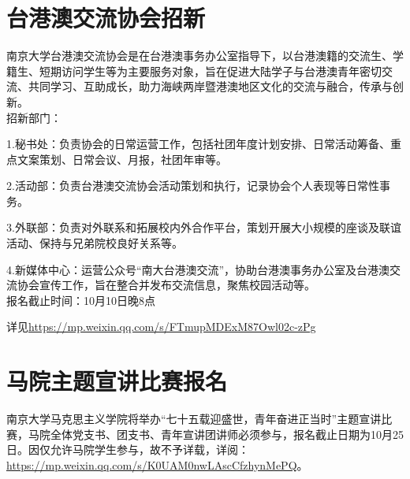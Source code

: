 \documentclass[letterpaper, 12pt]{article}
\begin{document}
\begin{multicols}{2}
\section{台港澳交流协会招新}
南京大学台港澳交流协会是在台港澳事务办公室指导下，以台港澳籍的交流生、学籍生、短期访问学生等为主要服务对象，旨在促进大陆学子与台港澳青年密切交流、共同学习、互助成长，助力海峡两岸暨港澳地区文化的交流与融合，传承与创新。\\

招新部门：

1.秘书处：负责协会的日常运营工作，包括社团年度计划安排、日常活动筹备、重点文案策划、日常会议、月报，社团年审等。

2.活动部：负责台港澳交流协会活动策划和执行，记录协会个人表现等日常性事务。

3.外联部：负责对外联系和拓展校内外合作平台，策划开展大小规模的座谈及联谊活动、保持与兄弟院校良好关系等。

4.新媒体中心：运营公众号“南大台港澳交流”，协助台港澳事务办公室及台港澳交流协会宣传工作，旨在整合并发布交流信息，聚焦校园活动等。\\

报名截止时间：10月10日晚8点

详见\url{https://mp.weixin.qq.com/s/FTmupMDExM87Owl02c-zPg}
\section{马院主题宣讲比赛报名}
南京大学马克思主义学院将举办“七十五载迎盛世，青年奋进正当时”主题宣讲比赛，马院全体党支书、团支书、青年宣讲团讲师必须参与，报名截止日期为10月25日。因仅允许马院学生参与，故不予详载，详阅：\url{https://mp.weixin.qq.com/s/K0UAM0nwLAscCfzhynMePQ}。
\end{multicols} 
\end{document}
